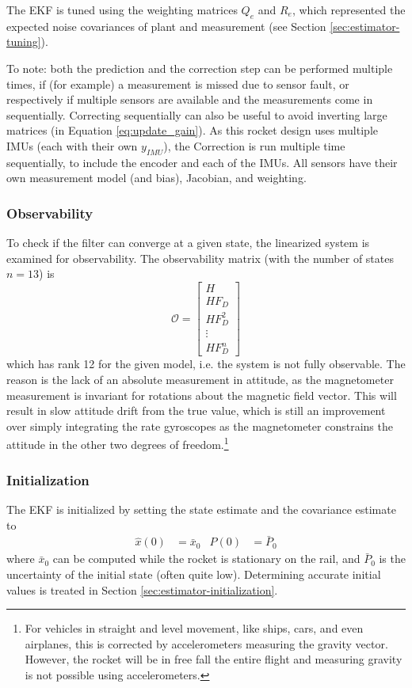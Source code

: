 The EKF is tuned using the weighting matrices $Q_e$ and $R_e$, which represented the expected noise covariances of plant and measurement (see Section \ref{sec:estimator-tuning}).

To note: both the prediction and the correction step can be performed multiple times, if (for example) a measurement is missed due to sensor fault, or respectively if multiple sensors are available and the measurements come in sequentially.
Correcting sequentially can also be useful to avoid inverting large matrices (in Equation \ref{eq:update_gain}).
As this rocket design uses multiple IMUs (each with their own $y_{IMU}$), the Correction is run multiple time sequentially, to include the encoder and each of the IMUs.
All sensors have their own measurement model (and bias), Jacobian, and weighting.

\subsubsection{Observability}
To check if the filter can converge at a given state, the linearized system is examined for observability.
The observability matrix (with the number of states $n=13$) is 
\begin{equation}
    \mathcal{O} = \begin{bmatrix}
        H \\ H F_D \\ H F_D^2 \\ \vdots \\ H F_D^n
    \end{bmatrix}
\end{equation}
which has rank 12 for the given model, i.e. the system is not fully observable. 
The reason is the lack of an absolute measurement in attitude, as the magnetometer measurement is invariant for rotations about the magnetic field vector. 
This will result in slow attitude drift from the true value, which is still an improvement over simply integrating the rate gyroscopes as the magnetometer constrains the attitude in the other two degrees of freedom.\footnote{For vehicles in straight and level movement, like ships, cars, and even airplanes, this is corrected by accelerometers measuring the gravity vector. However, the rocket will be in free fall the entire flight and measuring gravity is not possible using accelerometers.}

\subsubsection{Initialization}
The EKF is initialized by setting the state estimate and the covariance estimate to 
\begin{align}
    \hat x (0) &= \bar x_0 & P(0) &= \bar P_0
\end{align}
where $\bar x_0$ can be computed while the rocket is stationary on the rail, and $\bar P_0$ is the uncertainty of the initial state (often quite low).
Determining accurate initial values is treated in Section \ref{sec:estimator-initialization}.  



